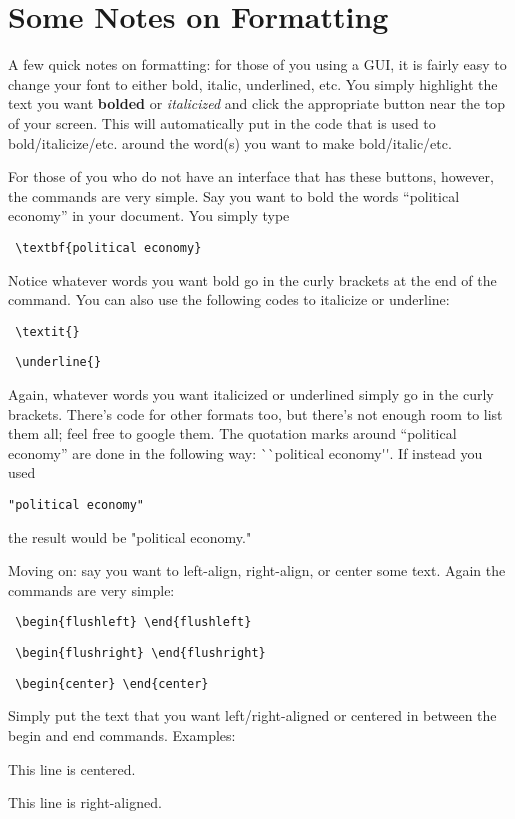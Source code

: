 \documentclass{article}
\begin{document}
\section*{Some Notes on Formatting}
A few quick notes on formatting: for those of you using a GUI, it is fairly easy to change your font to either bold, italic, underlined, etc. You simply highlight the text you want \textbf{bolded} or \textit{italicized} and click the appropriate button near the top of your screen. This will automatically put in the code that is used to bold/italicize/etc. around the word(s) you want to make bold/italic/etc. 

For those of you who do not have an interface that has these buttons, however, the commands are very simple. Say you want to bold the words ``political economy'' in your document. You simply type \begin{verbatim} \textbf{political economy} \end{verbatim} Notice whatever words you want bold go in the curly brackets at the end of the command. You can also use the following codes to italicize or underline: \begin{verbatim} \textit{} \end{verbatim} \begin{verbatim} \underline{} \end{verbatim} Again, whatever words you want italicized or underlined simply go in the curly brackets. There's code for other formats too, but there's not enough room to list them all; feel free to google them. The quotation marks around ``political economy'' are done in the following way: \`{}\`{}political economy\'{}\'{}. If instead you used \begin{verbatim}"political economy"\end{verbatim} the result would be "political economy."

Moving on: say you want to left-align, right-align, or center some text. Again the commands are very simple: \begin{verbatim} \begin{flushleft} \end{flushleft} \end{verbatim} \begin{verbatim} \begin{flushright} \end{flushright} \end{verbatim} \begin{verbatim} \begin{center} \end{center}\end{verbatim} Simply put the text that you want left/right-aligned or centered in between the begin and end commands. Examples:
\begin{center} This line is centered. \end{center} 
\begin{flushright} This line is right-aligned. \end{flushright}
\end{document}

